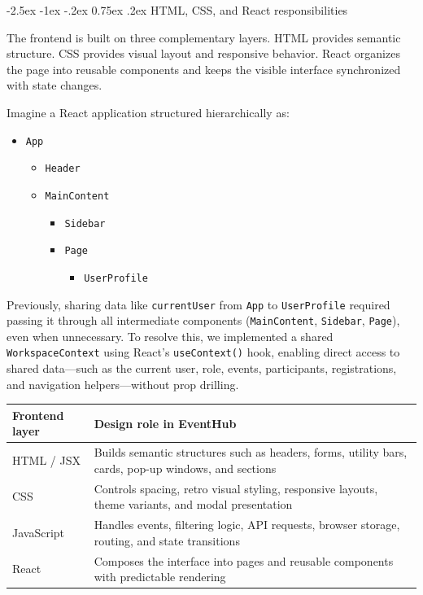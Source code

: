 \documentclass[11pt,a4paper]{article}
\makeatletter
\renewcommand\subsection{\@startsection{subsection}{2}{\z@}%
  {-2.5ex \@plus -1ex \@minus -.2ex}%
  {0.75ex \@plus .2ex}%
  {\normalfont\large\sffamily\bfseries\color{MidnightBlue}}}
\makeatother
\begin{document}
\subsection{HTML, CSS, and React responsibilities}

The frontend is built on three complementary layers. HTML provides semantic structure. CSS provides visual layout and responsive behavior. React organizes the page into reusable components and keeps the visible interface synchronized with state changes.

Imagine a React application structured hierarchically as:

\begin{itemize}
    \item \texttt{App}
    \begin{itemize}
        \item \texttt{Header}
        \item \texttt{MainContent}
        \begin{itemize}
            \item \texttt{Sidebar}
            \item \texttt{Page}
            \begin{itemize}
                \item \texttt{UserProfile}
            \end{itemize}
        \end{itemize}
    \end{itemize}
\end{itemize}

Previously, sharing data like \texttt{currentUser} from \texttt{App} to \texttt{UserProfile} required passing it through all intermediate components (\texttt{MainContent}, \texttt{Sidebar}, \texttt{Page}), even when unnecessary. To resolve this, we implemented a shared \texttt{WorkspaceContext} using React's \texttt{useContext()} hook, enabling direct access to shared data—such as the current user, role, events, participants, registrations, and navigation helpers—without prop drilling.

\begin{center}
\begin{tabularx}{\textwidth}{@{}lY@{}}
\toprule
\textbf{Frontend layer} & \textbf{Design role in EventHub} \\
\midrule
HTML / JSX & Builds semantic structures such as headers, forms, utility bars, cards, pop-up windows, and sections \\
CSS & Controls spacing, retro visual styling, responsive layouts, theme variants, and modal presentation \\
JavaScript & Handles events, filtering logic, API requests, browser storage, routing, and state transitions \\
React & Composes the interface into pages and reusable components with predictable rendering \\
\bottomrule
\end{tabularx}
\end{center}
\end{document}
